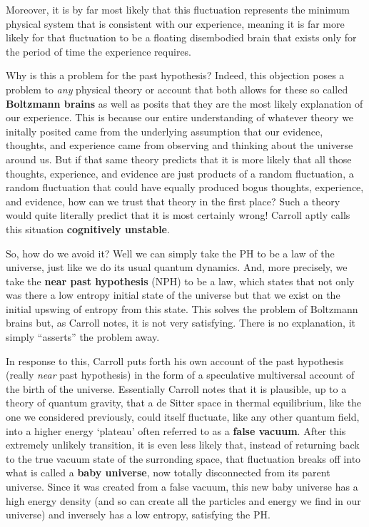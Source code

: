 \documentclass{article}
\begin{document}
Moreover, it is by far most likely that this fluctuation represents the minimum physical system that is consistent with our experience, meaning it is far more likely for that fluctuation to be a floating disembodied brain that exists only for the period of time the experience requires.

Why is this a problem for the past hypothesis? Indeed, this objection poses a problem to \textit{any} physical theory or account that both allows for these so called \textbf{Boltzmann brains} as well as posits that they are the most likely explanation of our experience. This is because our entire understanding of whatever theory we initally posited came from the underlying assumption that our evidence, thoughts, and experience came from observing and thinking about the universe around us. But if that same theory predicts that it is more likely that all those thoughts, experience, and evidence are just products of a random fluctuation, a random fluctuation that could have equally produced bogus thoughts, experience, and evidence, how can we trust that theory in the first place? Such a theory would quite literally predict that it is most certainly wrong! Carroll aptly calls this situation \textbf{cognitively unstable}.

So, how do we avoid it? Well we can simply take the PH to be a law of the universe, just like we do its usual quantum dynamics. And, more precisely, we take the \textbf{near past hypothesis} (NPH) to be a law, which states that not only was there a low entropy initial state of the universe but that we exist on the initial upswing of entropy from this state. This solves the problem of Boltzmann brains but, as Carroll notes, it is not very satisfying. There is no explanation, it simply ``asserts'' the problem away.

In response to this, Carroll puts forth his own account of the past hypothesis (really \textit{near} past hypothesis) in the form of a speculative multiversal account of the birth of the universe. Essentially Carroll notes that it is plausible, up to a theory of quantum gravity, that a de Sitter space in thermal equilibrium, like the one we considered previously, could itself fluctuate, like any other quantum field, into a higher energy `plateau' often referred to as a \textbf{false vacuum}. After this extremely unlikely transition, it is even less likely that, instead of returning back to the true vacuum state of the surronding space, that fluctuation breaks off into what is called a \textbf{baby universe}, now totally disconnected from its parent universe. Since it was created from a false vacuum, this new baby universe has a high energy density (and so can create all the particles and energy we find in our universe) and inversely has a low entropy, satisfying the PH.
\end{document}
